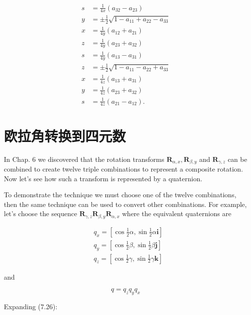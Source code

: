 $$
\begin{aligned}
s & =\frac{1}{4 x}\left(a_{32}-a_{23}\right) \\
y & =\pm \frac{1}{2} \sqrt{1-a_{11}+a_{22}-a_{33}} \\
x & =\frac{1}{4 y}\left(a_{12}+a_{21}\right) \\
z & =\frac{1}{4 y}\left(a_{23}+a_{32}\right) \\
s & =\frac{1}{4 y}\left(a_{13}-a_{31}\right) \\
z & =\pm \frac{1}{2} \sqrt{1-a_{11}-a_{22}+a_{33}} \\
x & =\frac{1}{4 z}\left(a_{13}+a_{31}\right) \\
y & =\frac{1}{4 z}\left(a_{23}+a_{32}\right) \\
s & =\frac{1}{4 z}\left(a_{21}-a_{12}\right) .
\end{aligned}
$$

\section{欧拉角转换到四元数}
In Chap. 6 we discovered that the rotation transforms $\mathbf{R}_{\alpha, x}, \mathbf{R}_{\beta, y}$ and $\mathbf{R}_{\gamma, z}$ can be combined to create twelve triple combinations to represent a composite rotation. Now let's see how such a transform is represented by a quaternion.

To demonstrate the technique we must choose one of the twelve combinations, then the same technique can be used to convert other combinations. For example, let's choose the sequence $\mathbf{R}_{\gamma, z} \mathbf{R}_{\beta, y} \mathbf{R}_{\alpha, x}$ where the equivalent quaternions are

$$
\begin{aligned}
& q_{x}=\left[\cos \frac{1}{2} \alpha, \sin \frac{1}{2} \alpha \mathbf{i}\right] \\
& q_{y}=\left[\cos \frac{1}{2} \beta, \sin \frac{1}{2} \beta \mathbf{j}\right] \\
& q_{z}=\left[\cos \frac{1}{2} \gamma, \sin \frac{1}{2} \gamma \mathbf{k}\right]
\end{aligned}
$$

and

$$
q=q_{z} q_{y} q_{x}
$$

Expanding (7.26):

